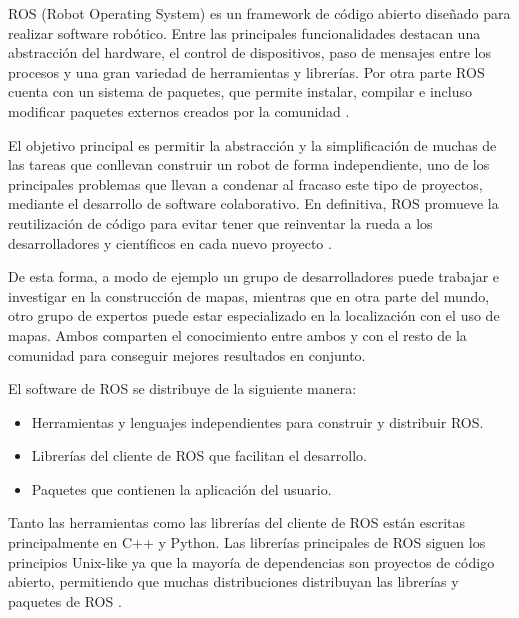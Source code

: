
ROS (Robot Operating System) es un framework de código abierto diseñado para
realizar software robótico. Entre las principales funcionalidades destacan una
abstracción del hardware, el control de dispositivos, paso de mensajes entre los
procesos y una gran variedad de herramientas y librerías. Por otra parte ROS
cuenta con un sistema de paquetes, que permite instalar, compilar e incluso
modificar paquetes externos creados por la comunidad \cite{ROSAbout}.

El objetivo principal es permitir la abstracción y la simplificación de  muchas
de las tareas que conllevan construir un robot de forma independiente, uno de
los principales problemas que llevan a condenar al fracaso este tipo de
proyectos, mediante el desarrollo de software colaborativo. En definitiva, ROS
promueve la reutilización de código para evitar tener que reinventar la rueda a
los desarrolladores y científicos en cada nuevo proyecto \cite{ROSIntro}.

De esta forma, a modo de ejemplo un grupo de desarrolladores puede trabajar e
investigar en la construcción de mapas, mientras que en otra parte del mundo,
otro grupo de expertos puede estar especializado en la localización con el uso
de mapas. Ambos comparten el conocimiento entre ambos y con el resto de la
comunidad para conseguir mejores resultados en conjunto.

El software de ROS se distribuye de la siguiente manera:

\begin{itemize}
  \item Herramientas y lenguajes independientes para construir y distribuir ROS.
  \item Librerías del cliente de ROS que facilitan el desarrollo.
  \item Paquetes que contienen la aplicación del usuario.
\end{itemize}

Tanto las herramientas como las librerías del cliente de ROS están escritas
principalmente en C++ y Python. Las librerías principales de ROS siguen los
principios Unix-like ya que la mayoría de dependencias son proyectos de código
abierto, permitiendo que muchas distribuciones distribuyan las librerías y
paquetes de ROS \cite{ROSWiki}.

